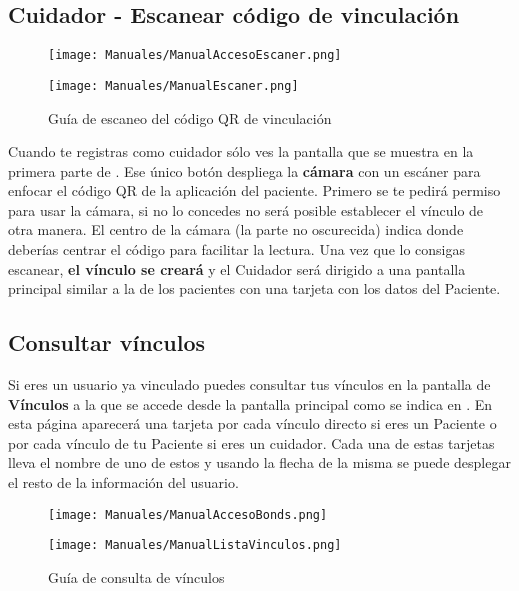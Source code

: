 \subsection{Cuidador - Escanear código de vinculación}

\begin{figure}[H]
    \centering
    \begin{minipage}{0.5\textwidth}
        \centering
        \texttt{[image: Manuales/ManualAccesoEscaner.png]}
    \end{minipage}\hfill
    \begin{minipage}{0.5\textwidth}
        \centering
        \texttt{[image: Manuales/ManualEscaner.png]}
    \end{minipage}\hfill
    \caption{Guía de escaneo del código QR de vinculación}
    \label{man:escanear_qr}
\end{figure}

Cuando te registras como cuidador sólo ves la pantalla que se muestra en la primera parte de . Ese único botón despliega la \textbf{cámara} con un escáner para enfocar el código QR de la aplicación del paciente. Primero se te pedirá permiso para usar la cámara, si no lo concedes no será posible establecer el vínculo de otra manera. El centro de la cámara (la parte no oscurecida) indica donde deberías centrar el código para facilitar la lectura. Una vez que lo consigas escanear, \textbf{el vínculo se creará} y el Cuidador será dirigido a una pantalla principal similar a la de los pacientes con una tarjeta con los datos del Paciente.

\subsection{Consultar vínculos}

Si eres un usuario ya vinculado puedes consultar tus vínculos en la pantalla de \textbf{Vínculos} a la que se accede desde la pantalla principal como se indica en . En esta página aparecerá una tarjeta por cada vínculo directo si eres un Paciente o por cada vínculo de tu Paciente si eres un cuidador. Cada una de estas tarjetas lleva el nombre de uno de estos y usando la flecha de la misma se puede desplegar el resto de la información del usuario.

\begin{figure}[H]
    \centering
    \begin{minipage}{0.5\textwidth}
        \centering
        \texttt{[image: Manuales/ManualAccesoBonds.png]}
    \end{minipage}\hfill
    \begin{minipage}{0.5\textwidth}
        \centering
        \texttt{[image: Manuales/ManualListaVinculos.png]}
    \end{minipage}\hfill
    \caption{Guía de consulta de vínculos}
    \label{man:consultar_vinculos}
\end{figure}

